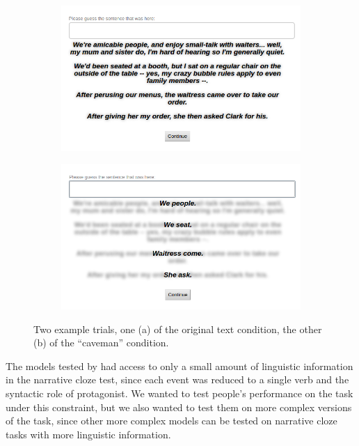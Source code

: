 \documentclass[10pt,a4paper]{article}
\begin{document}
\begin{figure}
 \centering
 \begin{subfigure}{0.4\paperwidth}
  \centering
  \includegraphics[width=0.35\paperwidth]{images/trial-full-text.png}
  \caption{}
  \label{fig:trial-full-text}
 \end{subfigure}
 \begin{subfigure}{0.4\paperwidth}
  \centering
  \includegraphics[width=0.35\paperwidth]{images/trial-caveman.png}
  \caption{}
  \label{fig:trial-caveman}
 \end{subfigure}
 \caption{Two example trials, one (a) of the original text condition, the other (b) of the ``caveman'' condition.}
 \label{fig:trial}
\end{figure}


The models tested by  had access to only a small amount of linguistic information in the narrative cloze test, since each event was reduced to a single verb and the syntactic role of protagonist.
We wanted to test people's performance on the task under this constraint, but we also wanted to test them on more complex versions of the task, since other more complex models can be tested on narrative cloze tasks with more linguistic information.
\end{document}

